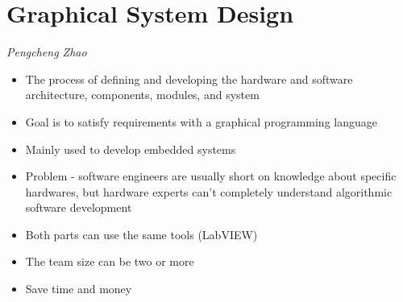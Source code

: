\documentclass{report}
\begin{document}
		\section{Graphical System Design}
			\textit{Pengcheng Zhao}
			\begin{itemize}
				\item The process of defining and developing the hardware and software architecture, components, modules, and system
				\item Goal is to satisfy requirements with a graphical programming language
				\item Mainly used to develop embedded systems
				\item Problem - software engineers are usually short on knowledge about specific hardwares, but hardware experts can't completely understand algorithmic software development
				\item Both parts can use the same tools (LabVIEW)
				\item The team size can be two or more
				\item Save time and money
			\end{itemize}
\end{document}
